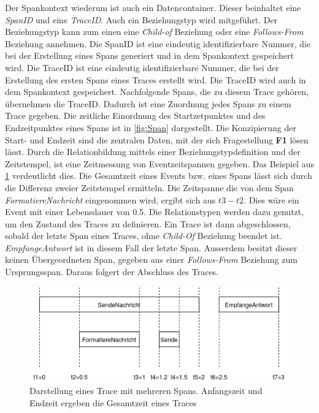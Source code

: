 Der Spankontext wiederum ist auch ein Datencontainer. Dieser beinhaltet eine \emph{SpanID} und eine \emph{TraceID}. Auch ein Beziehungstyp wird mitgeführt. Der Beziehungstyp kann zum einen eine \emph{Child-of} Beziehung oder eine \emph{Follows-From} Beziehung annehmen. Die SpanID ist eine eindeutig identifizierbare Nummer, die bei der Erstellung eines Spans generiert und in dem Spankontext gespeichert wird. Die TraceID ist eine eindeutig identifizierbare Nummer, die bei der Erstellung des ersten Spans eines Traces erstellt wird. Die TraceID wird auch in dem Spankontext gespeichert. Nachfolgende Spans, die zu diesem Trace gehören, übernehmen die TraceID. Dadurch ist eine Zuordnung jedes Spans zu einem Trace gegeben. Die zeitliche Einordnung des Startzetpunktes und des Endzeitpunktes eines Spans ist in  \cref{fig:Span} dargestellt. Die Konzipierung der Start- und Endzeit sind die zentralen Daten, mit der sich Fragestellung \textbf{F1} lösen lässt. Durch die Relationbildung mittels einer Beziehungstypdefinition und der Zeitstempel, ist eine Zeitmessung von Eventzeitspannen gegeben. Das Beispiel aus \cref{fig:Eventzeitspannen} verdeutlicht dies. Die Gesamtzeit eines Events bzw. eines Spans lässt sich durch die Differenz zweier Zeitstempel ermitteln. Die Zeitspanne die von dem Span \emph{FormatiereNachricht} eingenommen wird, ergibt sich aus $t3 - t2$. Dies wäre ein Event mit einer Lebensdauer von 0.5. Die Relationstypen werden dazu genutzt, um den Zustand des Traces zu definieren. Ein Trace ist dann abgeschlossen, sobald der letzte Span eines Traces, ohne \emph{Child-Of} Beziehung beendet ist. \emph{EmpfangeAntwort} ist in diesem Fall der letzte Span. Ausserdem besitzt dieser keinen Übergeordneten Span, gegeben aus einer \emph{Follows-From} Beziehung zum Ursprungsspan. Daraus folgert der Abschluss des Traces.

\begin{figure}[!b]
	\centering
	\includegraphics[scale=0.7]{img/Design/Eventzeitspannen.png}
	\caption[Zeitmessung von Spans eines Traces]{Darstellung eines Trace mit mehreren Spans. Anfangszeit und Endzeit ergeben die Gesamtzeit eines Traces}
	\label{fig:Eventzeitspannen}
\end{figure}



